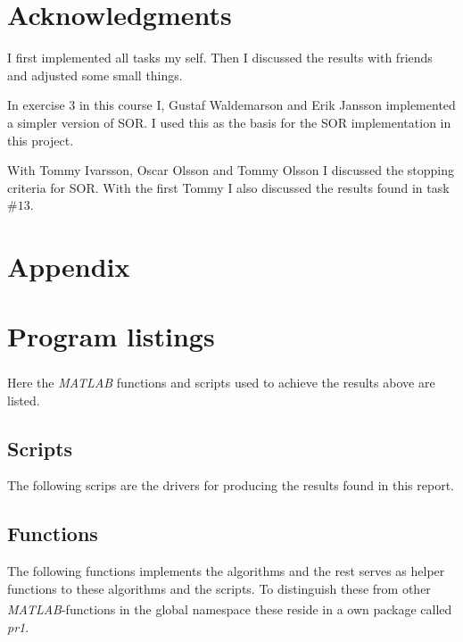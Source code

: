 \documentclass[10pt, a4paper]{article}
\newcommand{\matlab}{\small{\emph{MATLAB\textsuperscript{\textregistered}}}}
\begin{document}
\section{Acknowledgments}
I first implemented all tasks my self. Then I discussed the results with friends and adjusted some small things.

In exercise 3 in this course I, Gustaf Waldemarson and Erik Jansson implemented a simpler version of SOR. I used this as the basis for the SOR implementation in this project.

With Tommy Ivarsson, Oscar Olsson and Tommy Olsson I discussed the stopping criteria for SOR. With the first Tommy I also discussed the results found in task $\#13$.

{}


\newpage
\section*{Appendix}
\appendix
\section{Program listings} \label{appendix+programs}
Here the \matlab{} functions and scripts used to achieve the results above are listed.

\subsection{Scripts}
The following scrips are the drivers for producing the results found in this report.












\subsection{Functions}
The following functions implements the algorithms and the rest serves as helper functions to these algorithms and the scripts. To distinguish these from other \matlab{}-functions in the global namespace these reside in a own package called \emph{pr1}.











\end{document}
